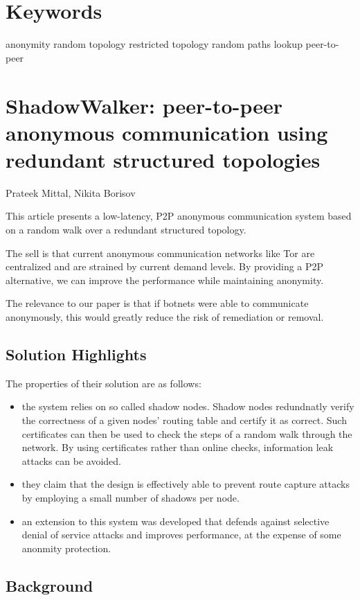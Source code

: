 \documentclass{article}
\begin{document}
\section{Keywords}
anonymity
random topology
restricted topology
random paths
lookup
peer-to-peer

\section{ShadowWalker: peer-to-peer anonymous communication using redundant structured topologies}

Prateek Mittal, Nikita Borisov

This article presents a low-latency, P2P anonymous communication system based on a random walk over a redundant structured topology.

The sell is that current anonymous communication networks like Tor are centralized and are strained by current demand levels.  By providing a P2P alternative, we can improve the performance while maintaining anonymity.

The relevance to our paper is that if botnets were able to communicate anonymously, this would greatly reduce the risk of remediation or removal.

\subsection{Solution Highlights}
The properties of their solution are as follows:

\begin{itemize}
\item the system relies on so called shadow nodes.  Shadow nodes redundnatly verify the correctness of a given nodes' routing table and certify it as correct.  Such certificates can then be used to check the steps of a random walk through the network.  By using certificates rather than online checks, information leak attacks can be avoided.
\item they claim that the design is effectively able to prevent route capture attacks by employing a small number of shadows per node.
\item an extension to this system was developed that defends against selective denial of service attacks and improves performance, at the expense of some anonmity protection.
\end{itemize}

\subsection{Background}
\end{document}
